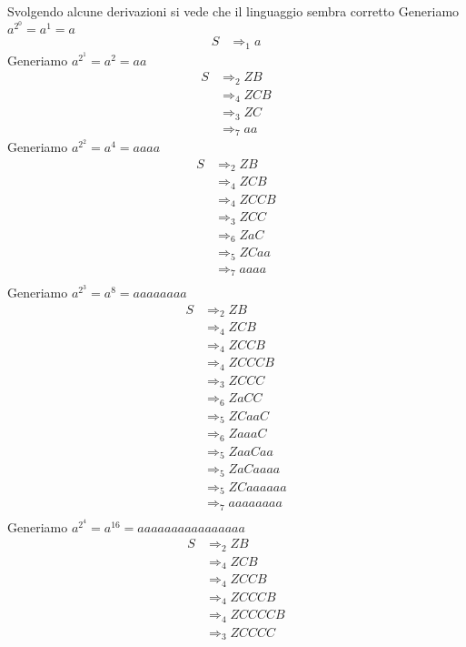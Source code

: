\documentclass[12pt, answers]{exam}
\newcommand{\der}{\Rightarrow}
\begin{document}
\begin{questions}
\begin{solution}
		Svolgendo alcune derivazioni si vede che il linguaggio sembra corretto
		Generiamo $a^{2^0} = a^1 = a$
		\begin{align*}
			S &\der_1 a
		\end{align*}
		Generiamo $a^{2^1} = a^2 = aa$
		\begin{align*}
			S &\der_2 Z B \\
			  &\der_4 Z C B \\
			  &\der_3 Z C \\
			  &\der_7 a a 
		\end{align*}
		Generiamo $a^{2^2} = a^4 = aaaa$
		\begin{align*}
			S &\der_2 Z B \\
			  &\der_4 Z C B \\
			  &\der_4 Z C C B \\
			  &\der_3 Z C C \\
			  &\der_6 Z a C \\
			  &\der_5 Z C a a \\
			  &\der_7 a a a a \\
		\end{align*}
		Generiamo $a^{2^3} = a^8 = aaaaaaaa$
		\begin{align*}
			S &\der_2 Z B \\
			  &\der_4 Z C B \\
			  &\der_4 Z C C B \\
			  &\der_4 Z C C C B \\
			  &\der_3 Z C C C \\
			  &\der_6 Z a C C \\
			  &\der_5 Z C a a C \\
			  &\der_6 Z a a a C \\
			  &\der_5 Z a a C a a \\
			  &\der_5 Z a C a a a a \\
			  &\der_5 Z C a a a a a a \\
			  &\der_7 a a a a a a a a \\
		\end{align*}
		Generiamo $a^{2^4} = a^{16} = aaaaaaaaaaaaaaaa$
		\begin{align*}
			S &\der_2 Z B \\
			  &\der_4 Z C B \\
			  &\der_4 Z C C B \\
			  &\der_4 Z C C C B \\
			  &\der_4 Z C C C C B \\
			  &\der_3 Z C C C C \\

\end{align*}
\end{solution}
\end{questions}
\end{document}
